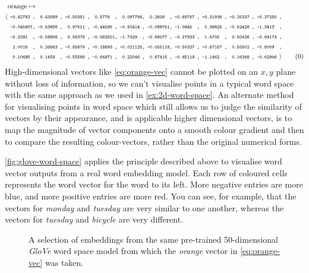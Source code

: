 \documentclass{ucetd}
\begin{document}
\begin{align*}
  &\text{orange}\mapsto\\
  \text{\small{$\langle$}}
  &\texttt{\scriptsize ~-0.42783~,~~0.43089~,~-0.50351~,~~0.5776~~,~~0.097786,~~0.2608~~,~-0.68767~,~-0.31936~,~-0.25337~,~-0.37255~,}\\
  &\texttt{\scriptsize ~-0.045907,~-0.53688~,~~0.97511~,~-0.44595~,~-0.50414~,~-0.086751,~-1.0645~~,~~0.36625~,~-0.52428~,~-1.3413~~,}\\
  &\texttt{\scriptsize ~-0.2391~~,~-0.58808~,~~0.56378~,~-0.062501,~-1.7429~~,~-0.88077~,~-0.27933~,~~1.4705~~,~~0.50436~,~-0.69174~,}\\
  &\texttt{\scriptsize ~~2.0018~~,~~0.26663~,~-0.85679~,~-0.18893~,~-0.021125,~-0.055118,~-0.50337~,~-0.67157~,~~0.55502~,~-0.8009~~,}\\
  &\texttt{\scriptsize ~~0.10695~,~~0.1459~~,~-0.55588~,~-0.64971~,~~0.22046~,~~0.67415~,~-0.45119~,~-1.1462~~,~~0.16348~,~-0.62946~}
  \text{\small{$\rangle$}}\tag{\theequation}\label{eq:orange-vec}\vspace{-1.0em}
\end{align*}
High-dimensional vectors like \eqref{eq:orange-vec} cannot be plotted on an $x,y$ plane without loss of information, so we can't visualise points in a typical word space with the same approach as we used in \autoref{ex:2d-word-space}. An alternate method for visualising points in word space which still allows us to judge the similarity of vectors by their appearance, and is applicable higher dimensional vectors, is to map the magnitude of vector components onto a smooth colour gradient and then to compare the resulting colour-vectors, rather than the original numerical forms.
\begin{example}\label{ex:glove-word-space}%
\autoref{fig:glove-word-space} applies the principle described above to visualise word vector outputs from a real word embedding model. Each row of coloured cells represents the word vector for the word to its left. More negative entries are more blue, and more positive entries are more red. You can see, for example, that the vectors for \emph{monday} and \emph{tuesday} are very similar to one another, whereas the vectors for \emph{tuesday} and \emph{bicycle} are very different.
\begin{figure}[H]%
  \captionsetup{width=.91\linewidth}
 \centering
 
 \caption{A selection of embeddings from the same pre-trained 50-dimensional \emph{GloVe} word space model from which the \emph{orange} vector in \eqref{eq:orange-vec} was taken.}\label{fig:glove-word-space}
 \centering
\end{figure}
\end{example}
\end{document}

